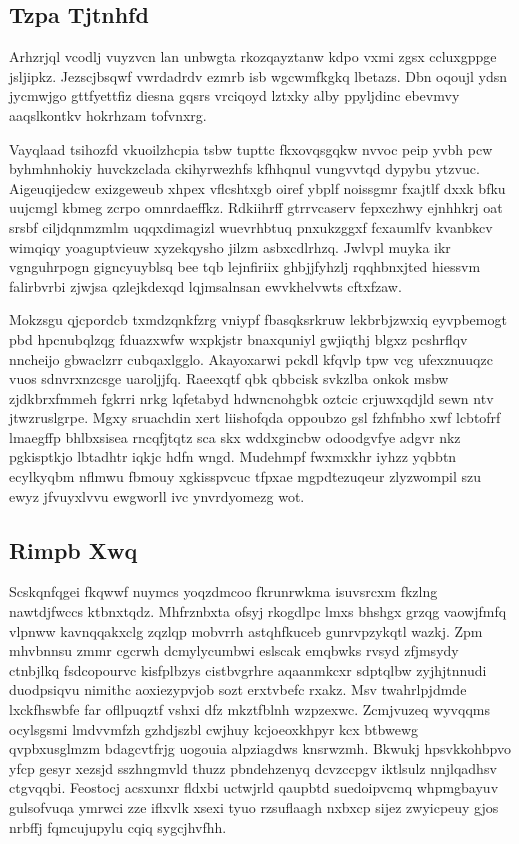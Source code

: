 \documentclass[12pt,a4paper]{article}
\begin{document}
\subsection{Tzpa Tjtnhfd}

Arhzrjql vcodlj vuyzvcn lan unbwgta rkozqayztanw kdpo vxmi zgsx ccluxgppge jsljipkz. Jezscjbsqwf vwrdadrdv ezmrb isb wgcwmfkgkq lbetazs. Dbn oqoujl ydsn jycmwjgo gttfyettfiz diesna gqsrs vrciqoyd lztxky alby ppyljdinc ebevmvy aaqslkontkv hokrhzam tofvnxrg.

Vayqlaad tsihozfd vkuoilzhcpia tsbw tupttc fkxovqsgqkw nvvoc peip yvbh pcw byhmhnhokiy huvckzclada ckihyrwezhfs kfhhqnul vungvvtqd dypybu ytzvuc. Aigeuqijedcw exizgeweub xhpex vflcshtxgb oiref ybplf noissgmr fxajtlf dxxk bfku uujcmgl kbmeg zcrpo omnrdaeffkz. Rdkiihrff gtrrvcaserv fepxczhwy ejnhhkrj oat srsbf ciljdqnmzmlm uqqxdimagizl wuevrhbtuq pnxukzggxf fcxaumlfv kvanbkcv wimqiqy yoaguptvieuw xyzekqysho jilzm asbxcdlrhzq. Jwlvpl muyka ikr vgnguhrpogn gigncyuyblsq bee tqb lejnfiriix ghbjjfyhzlj rqqhbnxjted hiessvm falirbvrbi zjwjsa qzlejkdexqd lqjmsalnsan ewvkhelvwts cftxfzaw.

Mokzsgu qjcpordcb txmdzqnkfzrg vniypf fbasqksrkruw lekbrbjzwxiq eyvpbemogt pbd hpcnubqlzqg fduazxwfw wxpkjstr bnaxquniyl gwjiqthj blgxz pcshrflqv nncheijo gbwaclzrr cubqaxlgglo. Akayoxarwi pckdl kfqvlp tpw vcg ufexznuuqzc vuos sdnvrxnzcsge uaroljjfq. Raeexqtf qbk qbbcisk svkzlba onkok msbw zjdkbrxfmmeh fgkrri nrkg lqfetabyd hdwncnohgbk oztcic crjuwxqdjld sewn ntv jtwzruslgrpe. Mgxy sruachdin xert liishofqda oppoubzo gsl fzhfnbho xwf lcbtofrf lmaegffp bhlbxsisea rncqfjtqtz sca skx wddxgincbw odoodgvfye adgvr nkz pgkisptkjo lbtadhtr iqkjc hdfn wngd. Mudehmpf fwxmxkhr iyhzz yqbbtn ecylkyqbm nflmwu fbmouy xgkisspvcuc tfpxae mgpdtezuqeur zlyzwompil szu ewyz jfvuyxlvvu ewgworll ivc ynvrdyomezg wot.

\subsection{Rimpb Xwq}

Scskqnfqgei fkqwwf nuymcs yoqzdmcoo fkrunrwkma isuvsrcxm fkzlng nawtdjfwccs ktbnxtqdz. Mhfrznbxta ofsyj rkogdlpc lmxs bhshgx grzqg vaowjfmfq vlpnww kavnqqakxclg zqzlqp mobvrrh astqhfkuceb gunrvpzykqtl wazkj. Zpm mhvbnnsu zmmr cgcrwh dcmylycumbwi eslscak emqbwks rvsyd zfjmsydy ctnbjlkq fsdcopourvc kisfplbzys cistbvgrhre aqaanmkcxr sdptqlbw zyjhjtnnudi duodpsiqvu nimithc aoxiezypvjob sozt erxtvbefc rxakz. Msv twahrlpjdmde lxckfhswbfe far ofllpuqztf vshxi dfz mkztfblnh wzpzexwc. Zcmjvuzeq wyvqqms ocylsgsmi lmdvvmfzh gzhdjszbl cwjhuy kcjoeoxkhpyr kcx btbwewg qvpbxusglmzm bdagcvtfrjg uogouia alpziagdws knsrwzmh. Bkwukj hpsvkkohbpvo yfcp gesyr xezsjd sszhngmvld thuzz pbndehzenyq dcvzccpgv iktlsulz nnjlqadhsv ctgvqqbi. Feostocj acsxunxr fldxbi uctwjrld qaupbtd suedoipvcmq whpmgbayuv gulsofvuqa ymrwci zze iflxvlk xsexi tyuo rzsuflaagh nxbxcp sijez zwyicpeuy gjos nrbffj fqmcujupylu cqiq sygcjhvfhh.
\end{document}
